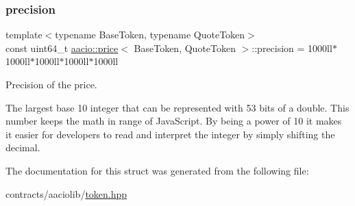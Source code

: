 \subsubsection{\texorpdfstring{precision}{precision}}
{\footnotesize\ttfamily template$<$typename Base\+Token, typename Quote\+Token$>$ \\
const uint64\+\_\+t \mbox{\hyperlink{structaacio_1_1price}{aacio\+::price}}$<$ Base\+Token, Quote\+Token $>$\+::precision = 1000ll$\ast$1000ll$\ast$1000ll$\ast$1000ll$\ast$1000ll\hspace{0.3cm}{\ttfamily [static]}}



Precision of the price. 

The largest base 10 integer that can be represented with 53 bits of a double. This number keeps the math in range of Java\+Script. By being a power of 10 it makes it easier for developers to read and interpret the integer by simply shifting the decimal. 

The documentation for this struct was generated from the following file\+:\begin{DoxyCompactItemize}
\item 
contracts/aaciolib/\mbox{\hyperlink{token_8hpp}{token.\+hpp}}\end{DoxyCompactItemize}
